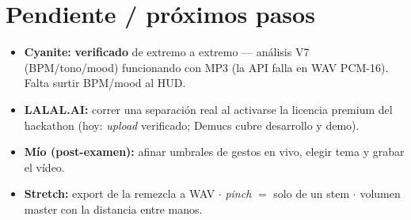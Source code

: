 \documentclass[11pt]{article}
\begin{document}
\section{Pendiente / próximos pasos}
\begin{itemize}
  \item \textbf{Cyanite:} \textbf{verificado} de extremo a extremo --- análisis V7 (BPM/tono/mood)
        funcionando con MP3 (la API falla en WAV PCM-16). Falta surtir BPM/mood al HUD.
  \item \textbf{LALAL.AI:} correr una separación real al activarse la licencia premium del hackathon
        (hoy: \emph{upload} verificado; Demucs cubre desarrollo y demo).
  \item \textbf{Mío (post-examen):} afinar umbrales de gestos en vivo, elegir tema y grabar el vídeo.
  \item \textbf{Stretch:} export de la remezcla a WAV $\cdot$ \emph{pinch} $=$ solo de un stem $\cdot$
        volumen master con la distancia entre manos.
\end{itemize}
\end{document}
